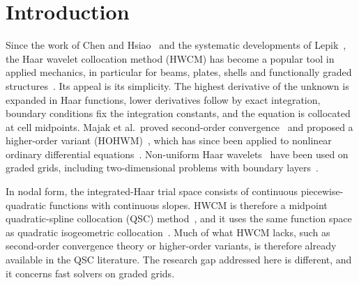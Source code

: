 \documentclass[preprint,12pt]{elsarticle}
\theoremstyle{remark}
\begin{document}
\section{Introduction}
Since the work of Chen and Hsiao~\cite{chen1997haar} and the systematic developments of
Lepik~\cite{lepik2005numerical,lepik2007application,lepik2011solving,lepik2014book}, the Haar wavelet
collocation method (HWCM) has become a popular tool in applied mechanics, in particular for beams,
plates, shells and functionally graded
structures~\cite{majak2015accuracy,majak2015convergence,majak2018higher}. Its appeal is its simplicity.
The highest derivative of the unknown is expanded in Haar functions, lower derivatives follow by exact
integration, boundary conditions fix the integration constants, and the equation is collocated at cell
midpoints. Majak et al.\ proved second-order convergence~\cite{majak2015convergence} and proposed a
higher-order variant (HOHWM)~\cite{majak2018higher}, which has since been applied to nonlinear ordinary
differential equations~\cite{ratas2021solving}. Non-uniform Haar
wavelets~\cite{dubeau2004nonuniform,lepik2008nonuniform} have been used on graded grids, including
two-dimensional problems with boundary layers~\cite{oruc2019nonuniform}.

In nodal form, the integrated-Haar trial space consists of continuous piecewise-quadratic functions
with continuous slopes. HWCM is therefore a midpoint quadratic-spline collocation (QSC)
method~\cite{houstis1988quadratic,christara1994quadratic,christara2006optimal,christara2002fast}, and it
uses the same function space as quadratic isogeometric
collocation~\cite{auricchio2010isogeometric,schillinger2013isogeometric,anitescu2015isogeometric,gomez2016variational}.
Much of what HWCM lacks, such as second-order convergence theory or higher-order variants, is
therefore already available in the QSC literature. The research gap addressed here is different, and
it concerns fast solvers on graded grids.
\end{document}
